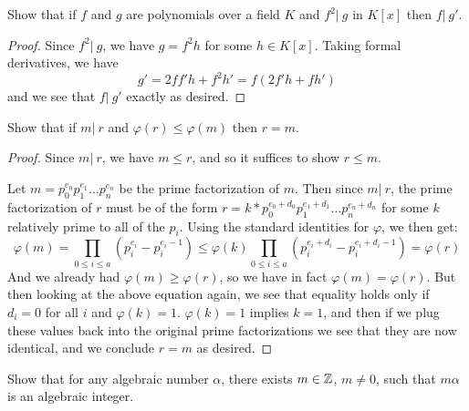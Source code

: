 \documentclass[11pt]{article}
\begin{document}
Show that if $f$ and $g$ are polynomials over a field $K$ and $f^2 |\ g$ in $K[x]$ then $f |\ g'$.

\begin{proof}
  Since $f^2 |\ g$, we have $g = f^2h$ for some $h \in K[x]$.
  Taking formal derivatives, we have $$g' = 2ff'h+f^2h' = f(2f'h+fh')$$ and we see that $f |\ g'$ exactly as desired.
\end{proof}


Show that if $m |\ r$ and $\varphi(r) \le \varphi(m)$ then $r = m$.

\begin{proof}
  Since $m |\ r$, we have $m \le r$, and so it suffices to show $r \le m$.

  Let $m = p_0^{e_0} p_1^{e_1} \dots p_n^{e_n}$ be the prime factorization of $m$.
  Then since $m |\ r$, the prime factorization of $r$ must be of the form $r = k * p_0^{e_0 + d_0} p_1^{e_1 + d_1} \dots p_n^{e_n + d_n}$ for some $k$ relatively prime to all of the $p_i$.
  Using the standard identities for $\varphi$, we then get:
  \begin{equation*}
    \varphi(m) = \prod_{0 \le i \le a} (p_i^{e_i} - p_i^{e_i - 1}) \le
    \varphi(k) \prod_{0 \le i \le a} (p_i^{e_i + d_i} - p_i^{e_i + d_i - 1})
    = \varphi(r)
  \end{equation*}
  And we already had $\varphi(m) \ge \varphi(r)$, so we have in fact $\varphi(m) = \varphi(r)$.
  But then looking at the above equation again, we see that equality holds only if $d_i = 0$ for all $i$ and $\varphi(k) = 1$.
  $\varphi(k) = 1$ implies $k = 1$, and then if we plug these values back into the original prime factorizations we see that they are now identical, and we conclude $r = m$ as desired.
\end{proof}


Show that for any algebraic number $\alpha$, there exists $m \in \mathbb{Z}$, $m \ne 0$, such that $m\alpha$ is an algebraic integer.
\end{document}
